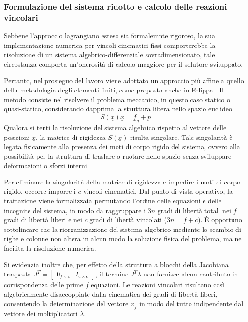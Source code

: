 \subsubsection{Formulazione del sistema ridotto e calcolo delle reazioni vincolari}
Sebbene l'approccio lagrangiano esteso sia formalemnte rigoroso, la sua implementazione numerica per vincoli cinematici fissi comporterebbe la risoluzione di un sistema algebrico-differenziale sovradimensionato, tale circostanza comporta un'onerosità di calcolo maggiore per il solutore sviluppato.

Pertanto, nel prosieguo del lavoro viene adottato un approccio più affine a quello della metodologia degli elementi finiti, come proposto anche in Felippa \cite{felippa2004ifem}. Il metodo consiste nel risolvere il problema meccanico, in questo caso statico o quasi-statico, considerando dapprima la struttura libera nello spazio euclideo. 
\begin{equation}
   S(\underline{x})\underline{x} = \underline{f}_g + \underline{p}
  \label{eq:problema_statico_2}
\end{equation}
Qualora si tenti la risoluzione del sistema algebrico rispetto al vettore delle posizioni $\underline{x}$, la matrice di rigidezza $S(\underline{x})$ risulta singolare. Tale singolarità è legata fisicamente alla presenza dei moti di corpo rigido del sistema, ovvero alla possibilità per la struttura di traslare o ruotare nello spazio senza sviluppare deformazioni o sforzi interni.

Per eliminare la singolarità della matrice di rigidezza e impedire i moti di corpo rigido, occorre imporre i $c$ vincoli cinematici. Dal punto di vista operativo, la trattazione viene formalizzata permutando l'ordine delle equazioni e delle incognite del sistema, in modo da raggruppare i $3n$ gradi di libertà totali nei $f$ gradi di libertà liberi e nei $c$ gradi di libertà vincolati ($3n = f + c$). È opportuno sottolineare che la riorganizzazione del sistema algebrico mediante lo scambio di righe e colonne non altera in alcun modo la soluzione fisica del problema, ma ne facilita la risoluzione numerica.

Si evidenzia inoltre che, per effetto della struttura a blocchi della Jacobiana trasposta $J^T = \begin{bmatrix} 0_{f \times c} & I_{c \times c} \end{bmatrix}$, il termine $J^T \underline{\lambda}$ non fornisce alcun contributo in corrispondenza delle prime $f$ equazioni. Le reazioni vincolari risultano così algebricamente disaccoppiate dalla cinematica dei gradi di libertà liberi, consentendo la determinazione del vettore $\underline{x}_f$ in modo del tutto indipendente dal vettore dei moltiplicatori $\underline{\lambda}$.


